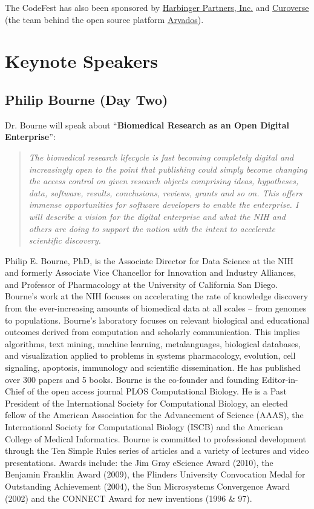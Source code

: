 \documentclass[12pt,oneside]{article}
\newcommand{\session}[3]{\clearpage\lhead{BOSC 2014 -- \textit{#1}\\#2\\#3}\newpage}
\begin{document}
\noindent
The CodeFest has also been sponsored by \href{http://harbinger-partners.com/}{Harbinger Partners, Inc.}
and \href{https://curoverse.com/}{Curoverse} (the team behind the open source platform
\href{http://arvados.org/}{Arvados}).

\session{Keynote Speakers}{Days One \& Two, 9 \& 10 July 2014}{}
\section*{Keynote Speakers}

\subsection*{Philip Bourne (Day Two)}
\noindent
Dr. Bourne will speak about ``\textbf{Biomedical Research as an Open Digital Enterprise}'':
\begin{quote}
\small
\textit{The biomedical research lifecycle is fast becoming completely digital
and increasingly open to the point that publishing could simply become changing
the access control on given research objects comprising ideas, hypotheses, data,
software, results, conclusions, reviews, grants and so on. This offers immense
opportunities for software developers to enable the enterprise. I will describe
a vision for the digital enterprise and what the NIH and others are doing to
support the notion with the intent to accelerate scientific discovery.}
\end{quote}
Philip E. Bourne, PhD, is the Associate Director for Data Science at the NIH
and formerly Associate Vice Chancellor for Innovation and Industry Alliances,
and Professor of Pharmacology at the University of California San Diego.
Bourne's work at the NIH focuses on accelerating the rate of knowledge
discovery from the ever-increasing amounts of biomedical data at all scales --
from genomes to populations.
Bourne's laboratory focuses on relevant biological and educational outcomes
derived from computation and scholarly communication. This implies algorithms,
text mining, machine learning, metalanguages, biological databases, and
visualization applied to problems in systems pharmacology, evolution, cell
signaling, apoptosis, immunology and scientific dissemination. He has published
over 300 papers and 5 books. Bourne is the co-founder and founding Editor-in-Chief
of the open access journal PLOS Computational Biology. He is a Past President of
the International Society for Computational Biology, an elected fellow of the
American Association for the Advancement of Science (AAAS), the International
Society for Computational Biology (ISCB) and the American College of Medical
Informatics.
Bourne is committed to professional development through the Ten Simple Rules
series of articles and a variety of lectures and video presentations. Awards
include: the Jim Gray eScience Award (2010), the Benjamin Franklin Award (2009),
the Flinders University Convocation Medal for Outstanding Achievement (2004),
the Sun Microsystems Convergence Award (2002) and the CONNECT Award for new
inventions (1996 \& 97).
\end{document}

